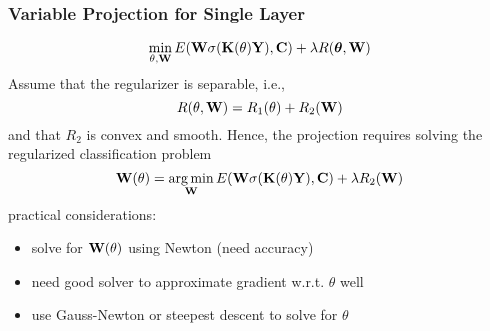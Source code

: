 \documentclass[12pt,fleqn]{beamer}
\begin{document}
\begin{frame}
	\frametitle{Variable Projection for Single Layer}
	
$$
\min_{\theta,{\bf W}} E({\bf W} \sigma({\bf K}(\theta){\bf Y} ), {\bf C}) + \lambda R({\boldsymbol \theta},{\bf W})
$$
Assume that the regularizer is separable, i.e.,
$$
 R(\theta,{\bf W}) =   R_1(\theta) +  R_2({\bf W})
$$
and that $R_2$ is convex and smooth. Hence, the projection requires solving the regularized classification problem
$$
{\bf W}(\theta) = \operatorname*{arg\,min}_{{\bf W}} E({\bf W}\sigma({\bf K}(\theta){\bf Y}), {\bf C}) + \lambda R_2({\bf W})
$$
practical considerations:
\begin{itemize}
	\item solve for ${\bf W}(\theta)$ using Newton (need accuracy)
	\item need good solver to approximate gradient w.r.t. $\theta$  well
	\item use Gauss-Newton or steepest descent to solve for $\theta$ 
\end{itemize}
\end{frame}
\end{document}
